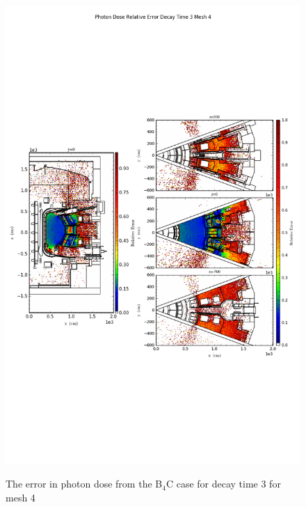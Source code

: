\begin{figure}[ht!]
\centering
\includegraphics[trim={0cm 9cm 0cm 10cm},clip,scale=0.75]{../plots/final_model_nob4c/Photon_Dose_Relative_Error_Decay_Time_3_Mesh_4.png}
\label{fig:photons_dc3_no4bc_m4_error}
\caption{The error in photon dose from the B$_4$C case for decay time 3 for mesh 4}
\end{figure}
